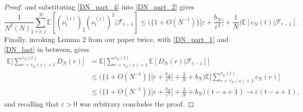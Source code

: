 \documentclass[a4paper,11pt]{article}
\theoremstyle{definition}
\newcommand{\F}{\mathcal{F}}
\newcommand{\E}{\mathbb{E}}
\newcommand{\1}{\mathds{1}}
\begin{document}
\begin{proof}
and substituting \eqref{DN_part_4} into \eqref{DN_part_2} gives
\begin{equation}
\frac{ 1 }{ N^2 ( N )_2 } \sum_{ i \neq j }^N \E[ ( \nu_t^{ ( i ) } )_2 ( \nu_t^{ ( j ) } )^2 | \F_{ t - 1 }  ] \leq \Bigg( \{ 1 + O( N^{ -1 } ) \} \Big[ \varepsilon + \frac{ b_N }{ \varepsilon^3 } \Big] + \frac{ 1 }{ N } \Bigg) \E[ c_N( t ) | \F_{ t - 1 } ]. \label{DN_last}
\end{equation}
Finally, invoking Lemma 2 from our paper twice, with \eqref{DN_part_1} and \eqref{DN_last} in between, gives
\begin{align*}
\E\Bigg[ \sum_{ r = \tau_N( s ) + 1 }^{ \tau_N( t ) } D_N( r ) \Bigg] &= \E\Bigg[ \sum_{ r = \tau_N( s ) + 1 }^{ \tau_N( t ) } \E[ D_N( r ) | \F_{ t - 1 } ] \Bigg] \\
&\leq \Bigg( \{ 1 + O( N^{ -1 } ) \} \Bigg[ \varepsilon + \frac{ b_N }{ \varepsilon^3 } \Bigg] + \frac{ 3 }{ N } + b_N \Bigg) \E\Bigg[ \sum_{ r = \tau_N( s ) + 1 }^{ \tau_N( t ) } c_N( r ) \Bigg] \\
&\leq \Bigg( \{ 1 + O( N^{ -1 } ) \} \Bigg[ \varepsilon + \frac{ b_N }{ \varepsilon^3 } \Bigg] + \frac{ 3 }{ N } + b_N \Bigg) ( t - s + 1 ) \rightarrow \varepsilon ( t - s + 1 ),
\end{align*}
and recalling that $\varepsilon > 0$ was arbitrary concludes the proof.
\end{proof}


  
\end{document}
